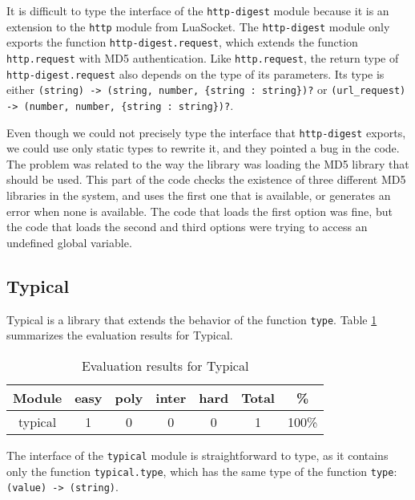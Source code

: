 It is difficult to type the interface of the \texttt{http-digest} module
because it is an extension to the \texttt{http} module from LuaSocket.
The \texttt{http-digest} module only exports the function
\texttt{http-digest.request}, which extends the function
\texttt{http.request} with MD5 authentication.
Like \texttt{http.request}, the return type of \texttt{http-digest.request}
also depends on the type of its parameters.
Its type is either
\texttt{(string) -> (string, number, \{string : string\})?} or
\texttt{(url\string_request) -> (number, number, \{string : string\})?}.

Even though we could not precisely type the interface that \texttt{http-digest}
exports, we could use only static types to rewrite it, and they pointed a bug
in the code.
The problem was related to the way the library was loading the MD5 library
that should be used. 
This part of the code checks the existence of three different MD5 libraries
in the system, and uses the first one that is available, or generates an
error when none is available.
The code that loads the first option was fine, but the code that loads the
second and third options were trying to access an undefined global variable.

\subsection{Typical}

Typical is a library that extends the behavior of the function \texttt{type}. 
Table \ref{tab:evaltypical} summarizes the evaluation results for Typical.

\begin{table}[!ht]
\begin{center}
\begin{tabular}{|c|c|c|c|c|c|c|}
\hline
\textbf{Module} & \textbf{easy} & \textbf{poly} & \textbf{inter} & \textbf{hard} & \textbf{Total} & \textbf{\%} \\
\hline
typical & 1 & 0 & 0 & 0 & 1 & 100\% \\
\hline
\end{tabular}
\end{center}
\caption{Evaluation results for Typical}
\label{tab:evaltypical}
\end{table}

The interface of the \texttt{typical} module is straightforward to type,
as it contains only the function \texttt{typical.type},
which has the same type of the function \texttt{type}: \texttt{(value) -> (string)}.

